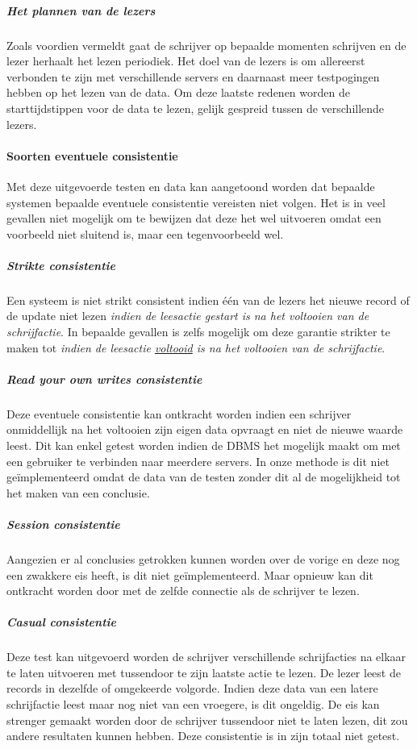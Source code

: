\subparagraph{Het plannen van de lezers} Zoals voordien vermeldt gaat de schrijver op bepaalde momenten schrijven en de lezer herhaalt het lezen periodiek. Het doel van de lezers is om allereerst verbonden te zijn met verschillende servers en daarnaast meer testpogingen hebben op het lezen van de data. Om deze laatste redenen worden de starttijdstippen voor de data te lezen, gelijk gespreid tussen de verschillende lezers. 

\paragraph{Soorten eventuele consistentie} Met deze uitgevoerde testen en data kan aangetoond worden dat bepaalde systemen bepaalde eventuele consistentie vereisten niet volgen. Het is in veel gevallen niet mogelijk om te bewijzen dat deze het wel uitvoeren omdat een voorbeeld niet sluitend is, maar een tegenvoorbeeld wel. 

\subparagraph{Strikte consistentie} Een systeem is niet strikt consistent indien één van de lezers het nieuwe record of de update niet lezen \textit{indien de leesactie gestart is na het voltooien van de schrijfactie}. In bepaalde gevallen is zelfs mogelijk om deze garantie strikter te maken tot \textit{indien de leesactie \underline{voltooid} is na het voltooien van de schrijfactie}. 

\subparagraph{Read your own writes consistentie} Deze eventuele consistentie kan ontkracht worden indien een schrijver onmiddellijk na het voltooien zijn eigen data opvraagt en niet de nieuwe waarde leest. Dit kan enkel getest worden indien de \gls{DBMS} het mogelijk maakt om met een gebruiker te verbinden naar meerdere servers.  In onze methode is dit niet geïmplementeerd omdat de data van de testen zonder dit al de mogelijkheid tot het maken van een conclusie.  

\subparagraph{Session consistentie} Aangezien er al conclusies getrokken kunnen worden over de vorige en deze nog een zwakkere eis heeft, is dit niet geïmplementeerd. Maar opnieuw kan dit ontkracht worden door met de zelfde connectie als de schrijver te lezen. 

\subparagraph{Casual consistentie} Deze test kan uitgevoerd worden de schrijver verschillende schrijfacties na elkaar te laten uitvoeren met tussendoor te zijn laatste actie te lezen. De lezer leest de records in dezelfde of omgekeerde volgorde. Indien deze data van een latere schrijfactie leest maar nog niet van een vroegere, is dit ongeldig. De eis kan strenger gemaakt worden door de schrijver tussendoor niet te laten lezen, dit zou andere resultaten kunnen hebben. Deze consistentie is in zijn totaal niet getest. 

